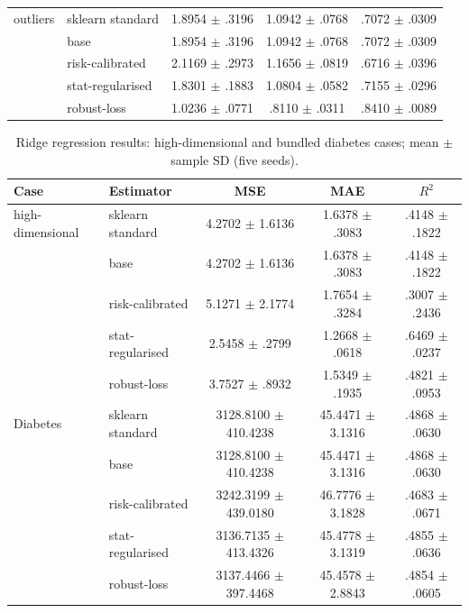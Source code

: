 \documentclass[conference]{IEEEtran}
\begin{document}
\begin{table}[t]
\begin{tabular}{llccc}
\midrule
outliers & sklearn standard & 1.8954 $\pm$ .3196 & 1.0942 $\pm$ .0768 & .7072 $\pm$ .0309 \\
 & base & 1.8954 $\pm$ .3196 & 1.0942 $\pm$ .0768 & .7072 $\pm$ .0309 \\
 & risk-calibrated & 2.1169 $\pm$ .2973 & 1.1656 $\pm$ .0819 & .6716 $\pm$ .0396 \\
 & stat-regularised & 1.8301 $\pm$ .1883 & 1.0804 $\pm$ .0582 & .7155 $\pm$ .0296 \\
 & robust-loss & 1.0236 $\pm$ .0771 & .8110 $\pm$ .0311 & .8410 $\pm$ .0089 \\
\bottomrule
\end{tabular}
\end{table}

\begin{table}[t]
\centering\scriptsize
\setlength{\tabcolsep}{2.6pt}
\caption{Ridge regression results: high-dimensional and bundled diabetes cases; mean $\pm$ sample SD (five seeds).}
\label{tab:ridge-b}
\begin{tabular}{llccc}
\toprule
Case & Estimator & MSE & MAE & $R^2$ \\
\midrule
high-dimensional & sklearn standard & 4.2702 $\pm$ 1.6136 & 1.6378 $\pm$ .3083 & .4148 $\pm$ .1822 \\
 & base & 4.2702 $\pm$ 1.6136 & 1.6378 $\pm$ .3083 & .4148 $\pm$ .1822 \\
 & risk-calibrated & 5.1271 $\pm$ 2.1774 & 1.7654 $\pm$ .3284 & .3007 $\pm$ .2436 \\
 & stat-regularised & 2.5458 $\pm$ .2799 & 1.2668 $\pm$ .0618 & .6469 $\pm$ .0237 \\
 & robust-loss & 3.7527 $\pm$ .8932 & 1.5349 $\pm$ .1935 & .4821 $\pm$ .0953 \\
\midrule
Diabetes & sklearn standard & 3128.8100 $\pm$ 410.4238 & 45.4471 $\pm$ 3.1316 & .4868 $\pm$ .0630 \\
 & base & 3128.8100 $\pm$ 410.4238 & 45.4471 $\pm$ 3.1316 & .4868 $\pm$ .0630 \\
 & risk-calibrated & 3242.3199 $\pm$ 439.0180 & 46.7776 $\pm$ 3.1828 & .4683 $\pm$ .0671 \\
 & stat-regularised & 3136.7135 $\pm$ 413.4326 & 45.4778 $\pm$ 3.1319 & .4855 $\pm$ .0636 \\
 & robust-loss & 3137.4466 $\pm$ 397.4468 & 45.4578 $\pm$ 2.8843 & .4854 $\pm$ .0605 \\
\bottomrule
\end{tabular}
\end{table}
\end{document}
